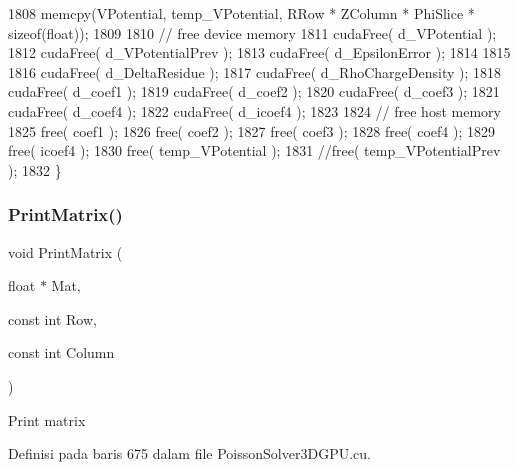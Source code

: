 \begin{DoxyCode}
1808     memcpy(VPotential, temp\_VPotential, RRow * ZColumn * PhiSlice * \textcolor{keyword}{sizeof}(\textcolor{keywordtype}{float}));
1809 
1810     \textcolor{comment}{// free device memory}
1811     cudaFree( d\_VPotential );
1812     cudaFree( d\_VPotentialPrev );
1813     cudaFree( d\_EpsilonError );
1814 
1815 
1816     cudaFree( d\_DeltaResidue );
1817     cudaFree( d\_RhoChargeDensity );
1818     cudaFree( d\_coef1 );
1819     cudaFree( d\_coef2 );
1820     cudaFree( d\_coef3 );
1821     cudaFree( d\_coef4 );
1822     cudaFree( d\_icoef4 );
1823 
1824     \textcolor{comment}{// free host memory}
1825     free( coef1 );
1826     free( coef2 );
1827     free( coef3 );
1828     free( coef4 );
1829     free( icoef4 );
1830     free( temp\_VPotential );
1831     \textcolor{comment}{//free( temp\_VPotentialPrev );}
1832 \}
\end{DoxyCode}
\hypertarget{PoissonSolver3DGPU_8cu_ae81f622f6c82ae791ba4bf486243c0e5}{}\label{PoissonSolver3DGPU_8cu_ae81f622f6c82ae791ba4bf486243c0e5} 
\subsubsection{\texorpdfstring{Print\+Matrix()}{PrintMatrix()}}
{\footnotesize\ttfamily void Print\+Matrix (\begin{DoxyParamCaption}\item[{float $\ast$}]{Mat,  }\item[{const int}]{Row,  }\item[{const int}]{Column }\end{DoxyParamCaption})}

Print matrix 

Definisi pada baris 675 dalam file Poisson\+Solver3\+D\+G\+P\+U.\+cu.


\hypertarget{PoissonSolver3DGPU_8cu_a982f277a379105d427d851806c8ba49b}{}\label{PoissonSolver3DGPU_8cu_a982f277a379105d427d851806c8ba49b} 
